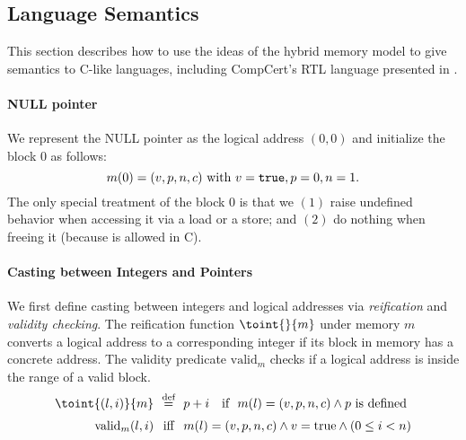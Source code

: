 



\subsection{Language Semantics}
\label{sec:intptrcast:formal-semantics:langsem}

This section describes how to use the ideas of the hybrid memory model to give semantics to C-like
languages, including CompCert's RTL language presented in .


\paragraph{NULL pointer} 
We represent the NULL pointer as the logical address $(0,0)$ and 
initialize the block $0$ as follows:
\[
m(0) = (v,p,n,c) \text{ with } v=\texttt{true}, p=0, n=1.
\]
The only special treatment of the block $0$ is that we $(1)$ raise
undefined behavior when accessing it via a load or a store;
and $(2)$ do nothing when freeing it (because  is allowed in C).


\paragraph{Casting between Integers and Pointers}


We first define casting between integers and logical addresses via \emph{reification} and \emph{validity checking}.
The reification function $\toint{}{m}$ under memory $m$
converts a logical address to a corresponding integer if its block in memory has a concrete address.
The validity predicate $\text{valid}_m$ checks if a logical address
is inside the range of a valid block.
\[
\begin{array}{@{}r@{~~}c@{~~}ll@{}}
\toint{(l, i)}{m} &\defeq& p + i &\text{if }~ m(l) = (v, p, n, c) \land p\text{ is defined} \\[2mm]
\text{valid}_m(l,i) &\text{iff}& 
\multicolumn{2}{@{}l@{}}{
m(l) = (v, p, n, c) \land v=\mathrm{true} \land (0\le i < n)}
\\
\end{array}
\]

